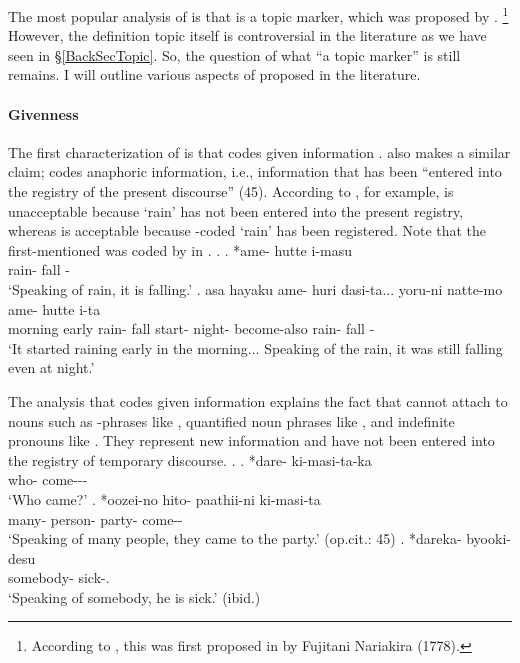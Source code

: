 The most popular analysis of 
is that  is a topic marker,
which was proposed by .%
 \footnote{
 According to ,
 this was first proposed in  by Fujitani Nariakira (1778).
 }
However, the definition topic itself is controversial in the literature
as we have seen in \S \ref{BackSecTopic}.
So, the question of what ``a topic marker'' is still remains.
I will outline various aspects of  proposed in the literature.

\paragraph{Givenness}

The first characterization of  is that
 codes given information
\cite[233]{chafe70}.
 also makes a similar claim;
 codes anaphoric information,
i.e.,
information that has been ``entered into the registry of the
present discourse'' (45).
According to , for example,
\Next[a] is unacceptable because
 `rain' has not been entered into the present registry,
whereas \Next[b] is acceptable because
-coded  `rain' has been registered.
Note that the first-mentioned  was coded by  in \Next[b].
%
\ex.
 \ag. *ame- hutte i-masu \\
       rain- fall - \\
       `Speaking of rain, it is falling.'
 \bg. asa hayaku ame- huri dasi-ta... yoru-ni natte-mo ame- hutte i-ta \\
       morning early rain- fall start- night- become-also rain- fall -\\
       `It started raining early in the morning...
       Speaking of the rain, it was still falling even at night.'
       \hfill{\cite[45]{kuno73}}


The analysis that  codes given information
explains the fact that
 cannot attach to nouns such as -phrases like \Next[a],
quantified noun phrases like \Next[b],
and indefinite pronouns like \Next[c].
They represent new information and have not been entered into the registry of temporary discourse.
%
\ex.
 \ag. *dare- ki-masi-ta-ka \\
       who- come--- \\
       `Who came?'
       \hfill{\cite[37]{kuno73}}
 \bg. *oozei-no hito- paathii-ni ki-masi-ta \\
       many- person- party- come-- \\
       `Speaking of many people, they came to the party.'
       \hfill{(op.cit.: 45)}
 \bg. *dareka- byooki-desu \\
       somebody- sick-.\\
       `Speaking of somebody, he is sick.'
       \hfill{(ibid.)}


